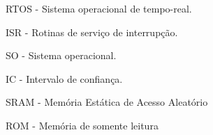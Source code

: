 \listoffigures*

\newpage
{}
\newpage
\listoftables*
\cleardoublepage

\begin{siglas}
	\item RTOS - Sistema operacional de tempo-real.
	\item ISR - Rotinas de serviço de interrupção.
	\item SO - Sistema operacional.
	\item IC - Intervalo de confiança.
	\item SRAM - Memória Estática de Acesso Aleatório
	\item ROM - Memória de somente leitura
\end{siglas}


\tableofcontents*
\cleardoublepage

